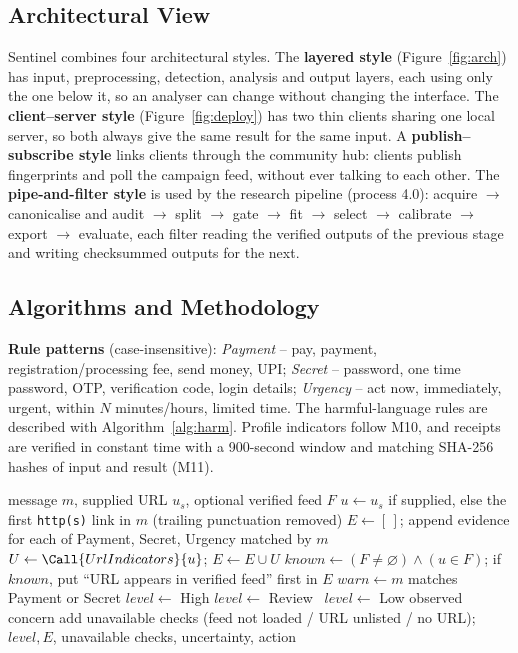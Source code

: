 \subsection{Architectural View}
\noindent Sentinel combines four architectural styles. The \textbf{layered style} (Figure~\ref{fig:arch}) has input, preprocessing, detection, analysis and output layers, each using only the one below it, so an analyser can change without changing the interface. The \textbf{client--server style} (Figure~\ref{fig:deploy}) has two thin clients sharing one local server, so both always give the same result for the same input. A \textbf{publish--subscribe style} links clients through the community hub: clients publish fingerprints and poll the campaign feed, without ever talking to each other. The \textbf{pipe-and-filter style} is used by the research pipeline (process 4.0): acquire $\rightarrow$ canonicalise and audit $\rightarrow$ split $\rightarrow$ gate $\rightarrow$ fit $\rightarrow$ select $\rightarrow$ calibrate $\rightarrow$ export $\rightarrow$ evaluate, each filter reading the verified outputs of the previous stage and writing checksummed outputs for the next.

\subsection{Algorithms and Methodology}\label{sec:algos}
\noindent\textbf{Rule patterns} (case-insensitive): \emph{Payment} -- pay, payment, registration/processing fee, send money, UPI; \emph{Secret} -- password, one time password, OTP, verification code, login details; \emph{Urgency} -- act now, immediately, urgent, within $N$ minutes/hours, limited time. The harmful-language rules are described with Algorithm~\ref{alg:harm}. Profile indicators follow M10, and receipts are verified in constant time with a 900-second window and matching SHA-256 hashes of input and result (M11).

\begin{algorithm}[!htbp]
\caption{Fraud (message and link) assessment}\label{alg:fraud}
\begin{algorithmic}[1]
\Require message $m$, supplied URL $u_s$, optional verified feed $F$
\State $u \gets u_s$ if supplied, else the first \texttt{http(s)} link in $m$ (trailing punctuation removed)
\State $E \gets [\,]$; append evidence for each of Payment, Secret, Urgency matched by $m$
\State $U \gets \Call{UrlIndicators}{u}$; \quad $E \gets E \cup U$
\State $known \gets (F \neq \varnothing) \wedge (u \in F)$; if $known$, put ``URL appears in verified feed'' first in $E$
\State $warn \gets m$ matches Payment or Secret
 $level \gets$ High
 $level \gets$ Review
\Else\ $level \gets$ Low observed concern
\EndIf
\State add unavailable checks (feed not loaded / URL unlisted / no URL); \Return $level, E$, unavailable checks, uncertainty, action
\end{algorithmic}
\end{algorithm}

